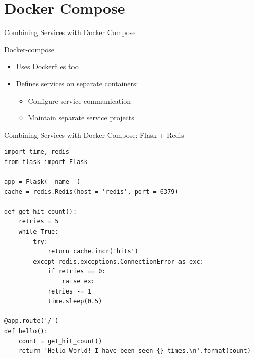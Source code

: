 \documentclass[10pt, compress, aspectratio=169, xcolor={table,usenames,dvipsnames}]{beamer}
\begin{document}
\section{Docker Compose}
\label{sec:org44dfba5}
\begin{frame}[label={sec:org3afca24}]{Combining Services with Docker Compose}
\begin{block}{Docker-compose}
\begin{itemize}
\item Uses \alert{Dockerfiles} too
\item Defines \alert{services} on \alert{separate containers}:
\begin{itemize}
\item Configure service \alert{communication}
\item Maintain separate service \alert{projects}
\end{itemize}
\end{itemize}
\end{block}
\end{frame}
\begin{frame}[label={sec:org12b7494},fragile]{Combining Services with Docker Compose: Flask + Redis}
 \lstset{language=Python,label= ,caption= ,captionpos=b,numbers=none}
\begin{lstlisting}
import time, redis
from flask import Flask

app = Flask(__name__)
cache = redis.Redis(host = 'redis', port = 6379)

def get_hit_count():
    retries = 5
    while True:
        try:
            return cache.incr('hits')
        except redis.exceptions.ConnectionError as exc:
            if retries == 0:
                raise exc
            retries -= 1
            time.sleep(0.5)

@app.route('/')
def hello():
    count = get_hit_count()
    return 'Hello World! I have been seen {} times.\n'.format(count)
\end{lstlisting}
\end{frame}
\end{document}
